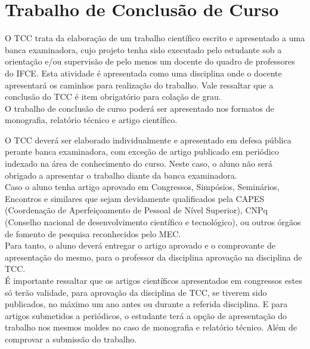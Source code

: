 \chapter{Trabalho de Conclusão de Curso}

O TCC trata da elaboração de um trabalho científico escrito e apresentado a uma banca examinadora, cujo projeto tenha sido executado pelo estudante sob a orientação e/ou supervisão de pelo menos um docente do quadro de professores do IFCE. Esta atividade é apresentada como uma disciplina onde o docente apresentará os caminhos para realização do trabalho. Vale ressaltar que a conclusão do TCC é item obrigatório para colação de grau.\\

O trabalho de conclusão de curso poderá ser apresentado nos formatos de monografia, relatório técnico e artigo científico.


O TCC deverá ser elaborado individualmente e apresentado em defesa pública perante banca examinadora, com exceção de artigo publicado em periódico indexado na área de conhecimento do curso. Neste caso, o aluno não será obrigado a apresentar o trabalho diante da banca examinadora.\\

Caso o aluno tenha artigo aprovado em Congressos, Simpósios, Seminários, Encontros e similares que sejam devidamente qualificados pela CAPES (Coordenação de Aperfeiçoamento de Pessoal de Nível Superior), CNPq (Conselho nacional de desenvolvimento científico e tecnológico), ou outros órgãos de fomento de pesquisa reconhecidos pelo MEC.\\

Para tanto, o aluno deverá entregar o artigo aprovado e o comprovante de apresentação do mesmo, para o professor da disciplina aprovação na disciplina de TCC.\\

É importante ressaltar que os artigos científicos apresentados em congressos estes só terão validade, para aprovação da disciplina de TCC, se tiverem sido publicados, no máximo um ano antes ou durante a referida disciplina. E para artigos submetidos a periódicos, o estudante terá a opção de apresentação do trabalho nos mesmos moldes no caso de monografia e relatório técnico. Além de comprovar a submissão do trabalho.\\

